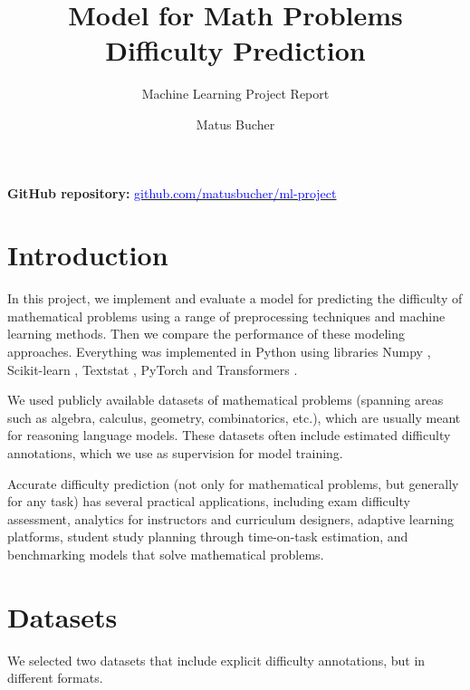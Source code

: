 \documentclass[runningheads]{llncs}
\begin{document}
\title{Model for Math Problems Difficulty Prediction}
\subtitle{Machine Learning Project Report}
\author{Matus Bucher \\ }

\maketitle


\textbf{GitHub repository:} \href{https://github.com/matusbucher/ml-project}{\textcolor{blue}{github.com/matusbucher/ml-project}}


\section{Introduction}
\label{sec:intro}

In this project, we implement and evaluate a model for predicting the difficulty of mathematical problems using a range of preprocessing techniques and machine learning methods. Then we compare the performance of these modeling approaches. Everything was implemented in Python using libraries Numpy \cite{numpy}, Scikit-learn \cite{scikit-learn}, Textstat \cite{textstat}, PyTorch \cite{pytorch} and Transformers \cite{transformers}.

We used publicly available datasets of mathematical problems (spanning areas such as algebra, calculus, geometry, combinatorics, etc.), which are usually meant for reasoning language models. These datasets often include estimated difficulty annotations, which we use as supervision for model training.

Accurate difficulty prediction (not only for mathematical problems, but generally for any task) has several practical applications, including exam difficulty assessment, analytics for instructors and curriculum designers, adaptive learning platforms, student study planning through time-on-task estimation, and benchmarking models that solve mathematical problems.


\section{Datasets}
\label{sec:datasets}

We selected two datasets that include explicit difficulty annotations, but in different formats.
\end{document}
